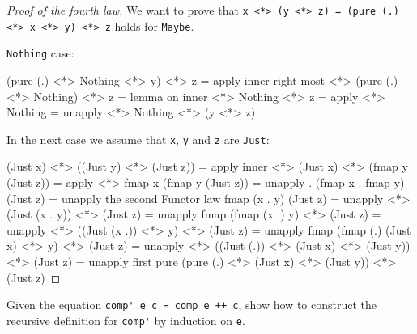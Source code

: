\documentclass[12pt]{article}
\newenvironment{code}{\endgraf\verbatim}{\endverbatim}
\newenvironment{problem}[2][Problem]{\begin{trivlist}
\item[\hskip \labelsep {\bfseries #1}\hskip \labelsep {\bfseries #2.}]}{\end{trivlist}}
\begin{document}
\begin{proof}[Proof of the fourth law]
We want to prove that \verb|x <*> (y <*> z) = (pure (.) <*> x <*> y) <*> z| holds for \verb|Maybe|.

\verb|Nothing| case:

\begin{code}
  (pure (.) <*> Nothing <*> y) <*> z
=   { apply inner right most <*> }
  (pure (.) <*> Nothing) <*> z
=   { lemma on inner <*> }
  Nothing <*> z
=   { apply <*> }
  Nothing
=   { unapply <*> }
  Nothing <*> (y <*> z)
\end{code}

In the next case we assume that \verb|x|, \verb|y| and \verb|z| are \verb|Just|:

\begin{code}
  (Just x) <*> ((Just y) <*> (Just z))
=   { apply inner <*> }
  (Just x) <*> (fmap y (Just z))
=   { apply <*> }
  fmap x (fmap y (Just z))
=   { unapply . }
  (fmap x . fmap y) (Just z)
=   { unapply the second Functor law }
  fmap (x . y) (Just z)
=   { unapply <*> }
  (Just (x . y)) <*> (Just z)
=   { unapply fmap }
  (fmap (x .) y) <*> (Just z)
=   { unapply <*> }
  ((Just (x .)) <*> y) <*> (Just z)
=   { unapply fmap }
  (fmap (.) (Just x) <*> y) <*> (Just z)
=   { unapply <*> }
  ((Just (.)) <*> (Just x) <*> (Just y)) <*> (Just z)
=   { unapply first pure }
  (pure (.) <*> (Just x) <*> (Just y)) <*> (Just z)
\end{code}
\end{proof}


\begin{problem}{5}
Given the equation \verb|comp' e c = comp e ++ c|, show how to construct the recursive definition for \verb|comp'| by induction on \verb|e|.
\end{problem}
\end{document}
